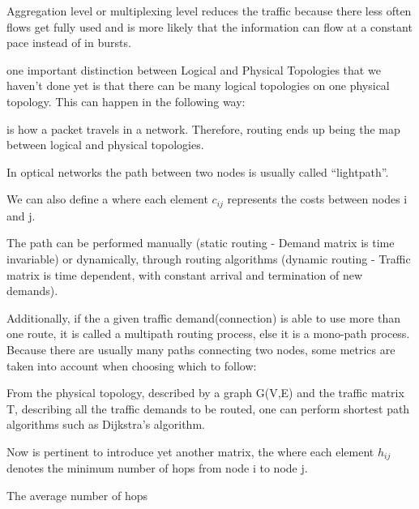 Aggregation level or multiplexing level reduces the traffic  because there less often flows get fully used and is more likely that the information can flow at a constant pace instead of in bursts.


 one important distinction between Logical and Physical Topologies that we haven't done yet is that there can be many logical topologies on one physical topology. This can happen in the following way: 





 is how a packet travels in a network. Therefore, routing ends up being the map between logical and physical topologies. 

In optical networks the path between two nodes is usually called ``lightpath''.

We can also define a  where each element $c_{ij}$ represents the costs between nodes i and j.

The path can be performed manually (static routing - Demand matrix is time invariable) or dynamically, through routing algorithms (dynamic routing - Traffic matrix is time dependent, with constant arrival and termination of new demands).

Additionally, if the a given traffic demand(connection) is able to use more than one route, it is called a multipath routing process, else it is a mono-path process. Because there are usually many paths connecting two nodes, some metrics are taken into account when choosing which to follow:



From the physical topology, described by a graph G(V,E) and the traffic matrix T, describing all the traffic demands to be routed, one can perform shortest path algorithms such as Dijkstra's algorithm.




Now is pertinent to introduce yet another matrix, the  where each element $h_{ij}$ denotes the minimum number of hops from node i to node j.

The average number of hops %

